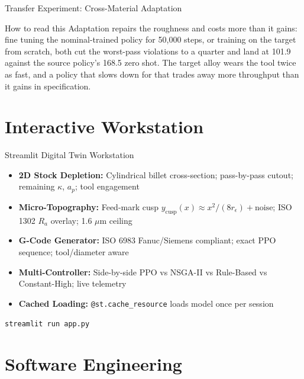 \documentclass[11pt,aspectratio=169]{beamer}
\newcommand{\Ra}{R_a}
\begin{document}
\begin{frame}{Transfer Experiment: Cross-Material Adaptation}
\begin{block}{How to read this}
    \alert{Adaptation repairs the roughness and costs more than it gains}: fine tuning the
    nominal-trained policy for 50,000 steps, or training on the target from scratch, both cut the
    worst-pass violations to a quarter and land at 101.9 against the source policy's 168.5 zero shot.
    The target alloy wears the tool twice as fast, and a policy that slows down for that trades away
    more throughput than it gains in specification.
    \end{block}
\end{frame}

\section{Interactive Workstation}

\begin{frame}{Streamlit Digital Twin Workstation}
    \begin{itemize}
        \item \textbf{2D Stock Depletion:} Cylindrical billet cross-section; pass-by-pass cutout; remaining $\kappa$, $a_p$; tool engagement
        \item \textbf{Micro-Topography:} Feed-mark cusp $y_{\text{cusp}}(x) \approx x^2/(8 r_\epsilon) + \text{noise}$; ISO 1302 $\Ra$ overlay; 1.6 $\mu$m ceiling
        \item \textbf{G-Code Generator:} ISO 6983 Fanuc/Siemens compliant; exact PPO sequence; tool/diameter aware
        \item \textbf{Multi-Controller:} Side-by-side PPO vs NSGA-II vs Rule-Based vs Constant-High; live telemetry
        \item \textbf{Cached Loading:} \texttt{@st.cache\_resource} loads model once per session
    \end{itemize}

    \vspace{1em}
    \centering
    \texttt{streamlit run app.py}
\end{frame}

\section{Software Engineering}
\end{document}
